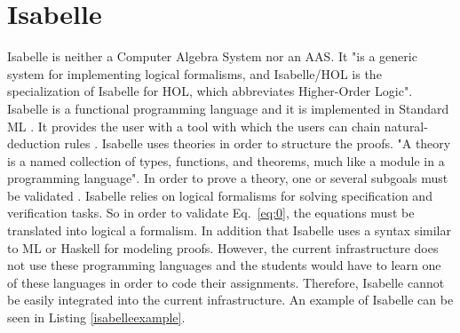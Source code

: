     \section{Isabelle}
    Isabelle is neither a Computer Algebra System nor an AAS. It "is a generic system for implementing logical formalisms, and Isabelle/HOL is the specialization of Isabelle for HOL, which abbreviates Higher-Order Logic"\cite[p.~3]{Nipkow-Paulson-Wenzel:2019}. Isabelle is a functional programming language
    and it is implemented in Standard ML \cite[p.~3]{Nipkow-Paulson-Wenzel:2019}. It provides the user with a tool with which the users can chain natural-deduction rules \cite[p.~3]{wenzel2002isabelle}. Isabelle uses theories in order to structure the proofs. "A theory
    is a named collection of types, functions, and theorems, much like a module in a programming language"\cite[p.~4]{Nipkow-Paulson-Wenzel:2019}. In order to prove a theory, one or several subgoals must be validated \cite[p.~12]{Nipkow-Paulson-Wenzel:2019}.
    Isabelle relies on logical formalisms for solving specification and verification tasks\cite[p.~3]{Nipkow-Paulson-Wenzel:2019}. So in order to validate Eq.~\eqref{eq:0}, the equations must be translated into logical a formalism.
    In addition that Isabelle uses a syntax similar to ML or Haskell for modeling proofs. However, the current infrastructure does not use these programming languages and the students would have to learn one of these languages in order to code their assignments.
    Therefore, Isabelle cannot be easily integrated into the current infrastructure. An example of Isabelle can be seen in Listing \ref{isabelleexample}.
    
    \newpage
